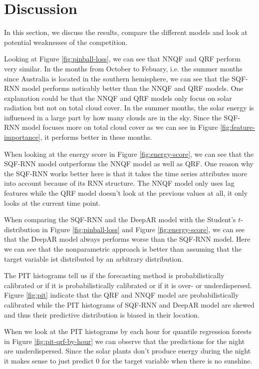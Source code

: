 \section{Discussion}
\label{sec:discussion}

In this section, we discuss the results, compare the different 
models and look at potential weaknesses of the competition. 

Looking at Figure \ref{fig:pinball-loss}, we can see that NNQF and QRF perform very similar. 
In the months from October to Febuary, i.e. the summer months since 
Australia is located in the southern hemisphere, we can see that 
the SQF-RNN model performs noticably better than the NNQF and QRF models. 
One explanation could be that the NNQF and QRF models only focus on solar 
radiation but not on total cloud cover. 
In the summer months, the solar energy is influenced in a large part by 
how many clouds are in the sky. Since the SQF-RNN model focuses more on 
total cloud cover as we can see in Figure \ref{fig:feature-importance}, 
it performs better in these months. 

When looking at the energy score in Figure \ref{fig:energy-score}, 
we can see that the SQF-RNN model outperforms the NNQF model as well as QRF.
One reason why the SQF-RNN works better here is that it takes 
the time series attributes more into account because of its RNN structure. 
The NNQF model only uses lag features while the QRF model doesn't look 
at the previous values at all, it only looks at the current time point.

When comparing the SQF-RNN and the DeepAR model with 
the Student's \(t\)-distribution in Figure \ref{fig:pinball-loss} and 
Figure \ref{fig:energy-score}, we can see that the DeepAR model 
always performs worse than the SQF-RNN model. 
Here we can see that the nonparametric approach is better than assuming 
that the target variable ist distributed by an arbitrary distribution. 

The PIT histograms tell us if the forecasting method is probabilistically 
calibrated or if it is probabilistically calibrated or 
if it is over- or underdispersed. 
Figure \ref{fig:pit} indicate that the QRF and NNQF model are 
probabilistically calibrated while the PIT histograms of SQF-RNN 
and DeepAR model are skewed and thus their predictive distribution is 
biased in their location.

When we look at the PIT histograms by each hour 
for quantile regression forests in Figure \ref{fig:pit-qrf-by-hour} 
we can observe that the predictions for the night are underdispersed. 
Since the solar plants don't produce energy during the night 
it makes sense to just predict \(0\) for the target variable when there is 
no sunshine.

